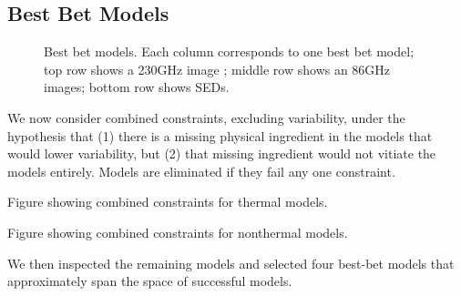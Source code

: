 \subsection{Best Bet Models}

\begin{figure}
    \centering
    \caption{Best bet models.  Each column corresponds to one best bet model; top row shows a 230GHz image ; middle row shows an 86GHz images; bottom row shows SEDs.}
    \label{fig:my_label}
\end{figure}


We now consider combined constraints, excluding variability, under the hypothesis that (1) there is a missing physical ingredient in the models that would lower variability, but (2) that missing ingredient would not vitiate the models entirely.  Models are eliminated if they fail any one constraint.

Figure showing combined constraints for thermal models.

Figure showing combined constraints for nonthermal models.

We then inspected the remaining models and selected four best-bet models that approximately span the space of successful models.  
